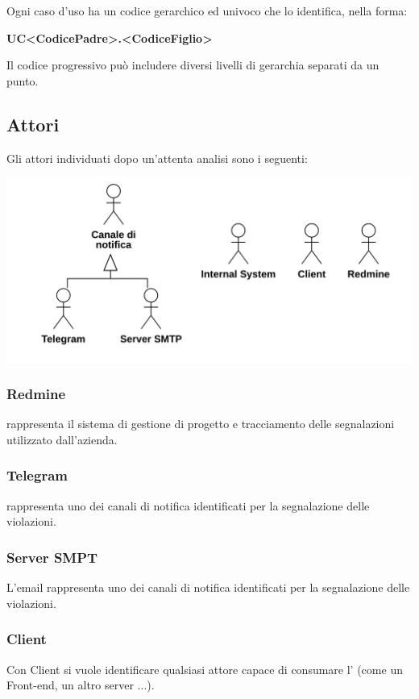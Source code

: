 Ogni caso d’uso ha un codice gerarchico ed univoco che lo identifica, nella forma:
\begin{center}
	\textbf{UC<CodicePadre>.<CodiceFiglio>}
\end{center}
Il codice progressivo può includere diversi livelli di gerarchia separati da un punto.

\subsection{Attori}
Gli attori individuati dopo un’attenta analisi sono i seguenti:

\begin{center}
	\includegraphics[keepaspectratio = true, width=15cm]{immagini/actors.png}
\end{center}

\subsubsection{Redmine}
 rappresenta il sistema di gestione di progetto e tracciamento delle segnalazioni utilizzato dall'azienda.
\subsubsection{Telegram}
 rappresenta uno dei canali di notifica identificati per la segnalazione delle violazioni.
\subsubsection{Server SMPT}
L'email rappresenta uno dei canali di notifica identificati per la segnalazione delle violazioni.
\subsubsection{Client}
Con Client si vuole identificare qualsiasi attore capace di consumare l'  (come un Front-end, un altro server ...).
